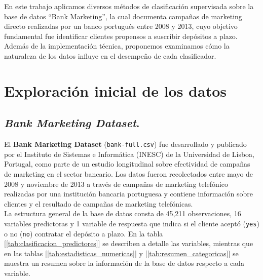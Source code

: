\documentclass[10pt]{article}
\begin{document}
En este trabajo aplicamos diversos métodos de clasificación supervisada sobre la base de datos ``Bank Marketing'', la cual documenta campañas de marketing directo realizadas por un banco portugués entre 2008 y 2013, cuyo objetivo fundamental fue identificar clientes propensos a suscribir depósitos a plazo. Además de la implementación técnica, proponemos examinamos cómo la naturaleza de los datos influye en el desempeño de cada clasificador. \\


\section{Exploración inicial de los datos}\label{sec:dataset}

\subsection{\textit{Bank Marketing Dataset}.}

El \textbf{Bank Marketing Dataset} (\texttt{bank-full.csv}) fue desarrollado y publicado por el Instituto de Sistemas e Informática (INESC) de la Universidad de Lisboa, Portugal, como parte de un estudio longitudinal sobre efectividad de campañas de marketing en el sector bancario. Los datos fueron recolectados entre mayo de 2008 y noviembre de 2013 a través de campañas de marketing telefónico realizadas por una institución bancaria portuguesa y contiene información sobre clientes y el resultado de campañas de marketing telefónicas.\\

La estructura general de la base de datos consta de 45,211 observaciones, 16 variables predictoras y 1 variable de respuesta que indica si el cliente aceptó (\texttt{yes}) o no (\texttt{no}) contratar el depósito a plazo. En la tabla [\ref{tab:clasificacion_predictores}] se describen a detalle las variables, mientras que en las tablas [\ref{tab:estadisticas_numericas}] y [\ref{tab:resumen_categoricas}] se muestra un resumen sobre la información de la base de datos respecto a cada variable.\\
\end{document}

